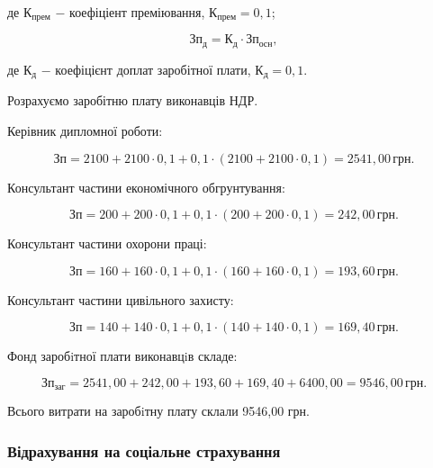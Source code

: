 \noindent де $\text{К}_{\text{прем}}$ $-$ коефіціент преміювання, $\text{К}_{\text{прем}} = 0,1$;

\begin{equation}
\text{Зп}_{\text{д}} = \text{К}_{\text{д}} \cdot \text{Зп}_{\text{осн}},
\end{equation}

\noindent де $\text{К}_{\text{д}}$ $-$ коефіцієнт доплат заробітної плати, $\text{К}_{\text{д}} = 0,1$. 

\vspace{1.5em}

Розрахуємо заробітню плату виконавців НДР.

Керівник дипломної роботи:

\[
\text{Зп} = 2100 + 2100 \cdot 0,1 + 0,1 \cdot (2100 + 2100 \cdot 0,1) = 2541,00 \, \text{грн}.
\]

\vspace{1.5em}

Консультант частини економічного обгрунтування:

\[
\text{Зп} = 200 + 200 \cdot 0,1 + 0,1 \cdot (200 + 200 \cdot 0,1) = 242,00 \, \text{грн}.
\]

\vspace{1.5em}

Консультант частини охорони праці:

\[
\text{Зп} = 160 + 160 \cdot 0,1 + 0,1 \cdot (160 + 160 \cdot 0,1) = 193,60 \, \text{грн}.
\]

\vspace{1.5em}

Консультант частини цивільного захисту:

\[
\text{Зп} = 140 + 140 \cdot 0,1 + 0,1 \cdot (140 + 140 \cdot 0,1) = 169,40 \, \text{грн}.
\]

\vspace{1.5em}

Фонд заробiтної плати виконавцiв складе:

\[
\text{Зп}_{\text{заг}} = 2541,00 + 242,00 + 193,60 + 169,40 + 6400,00 = 9546,00 \, \text{грн}.
\]

\vspace{1.5em}

Всього витрати на заробiтну плату склали 9546,00 грн.

\subsubsection{Відрахування на соціальне страхування}

